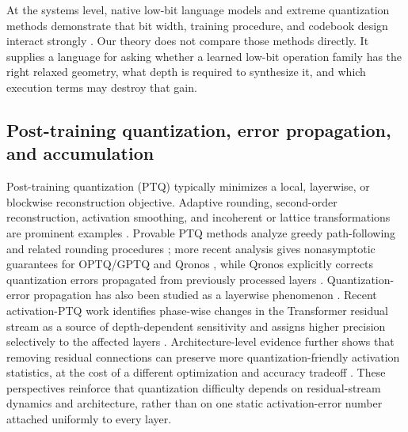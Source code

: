 \documentclass[twoside,11pt]{article}
\begin{document}
At the systems level, native low-bit language models and extreme quantization methods demonstrate that bit width, training procedure, and codebook design interact strongly \citep{WangEtAl2025BitNet,MaEtAl2024b158,MaEtAl2025b158,LiuEtAl2025ParetoQ,BulatOualiTzimiropoulos2024QBB,LeeEtAl2025LittleBit,WangEtAl2026CATQ}.  Our theory does not compare those methods directly.  It supplies a language for asking whether a learned low-bit operation family has the right relaxed geometry, what depth is required to synthesize it, and which execution terms may destroy that gain.

\subsection{Post-training quantization, error propagation, and accumulation}

Post-training quantization (PTQ) typically minimizes a local, layerwise, or blockwise reconstruction objective.  Adaptive rounding, second-order reconstruction, activation smoothing, and incoherent or lattice transformations are prominent examples \citep{NagelEtAl2020AdaRound,FrantarEtAl2023GPTQ,XiaoEtAl2023SmoothQuant,LinEtAl2024AWQ,TsengEtAl2024QuIPSharp}.  Provable PTQ methods analyze greedy path-following and related rounding procedures \citep{ZhangZhouSaab2023PTQ,ZhangZhouSaab2024Corrigendum}; more recent analysis gives nonasymptotic guarantees for OPTQ/GPTQ and Qronos \citep{ZhangEtAl2025ProvablePTQ}, while Qronos explicitly corrects quantization errors propagated from previously processed layers \citep{ZhangEtAl2026Qronos}.  Quantization-error propagation has also been studied as a layerwise phenomenon \citep{AraiIchikawa2025QEP}.  Recent activation-PTQ work identifies phase-wise changes in the Transformer residual stream as a source of depth-dependent sensitivity and assigns higher precision selectively to the affected layers \citep{ZhaoEtAl2026DynamicPTQ}.  Architecture-level evidence further shows that removing residual connections can preserve more quantization-friendly activation statistics, at the cost of a different optimization and accuracy tradeoff \citep{JiEtAl2026ResidualFreeQuantization}.  These perspectives reinforce that quantization difficulty depends on residual-stream dynamics and architecture, rather than on one static activation-error number attached uniformly to every layer.
\end{document}
